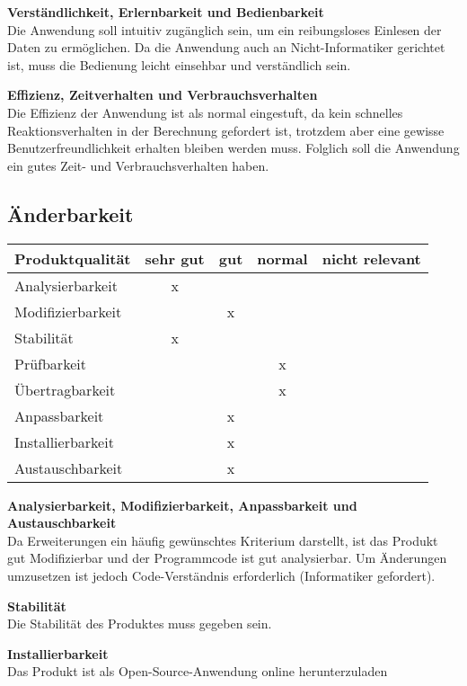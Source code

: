 \documentclass[parskip=full]{scrartcl} %
\begin{document}
\textbf{Verständlichkeit, Erlernbarkeit und Bedienbarkeit}\\
Die Anwendung soll intuitiv zugänglich sein, um ein reibungsloses Einlesen der Daten zu ermöglichen. Da die Anwendung auch an Nicht-Informatiker gerichtet ist, muss die Bedienung leicht einsehbar und verständlich sein.

\textbf{Effizienz, Zeitverhalten und Verbrauchsverhalten}\\
Die Effizienz der Anwendung ist als normal eingestuft, da kein schnelles Reaktionsverhalten in der Berechnung gefordert ist, trotzdem aber eine gewisse Benutzerfreundlichkeit erhalten bleiben werden muss. Folglich soll die Anwendung ein gutes Zeit- und Verbrauchsverhalten haben.

\subsection{Änderbarkeit}
    \begin{tabular}{|l| c| c| c| c|}
    \hline
        Produktqualität & sehr gut & gut & normal & nicht relevant \\
    \hline
        Analysierbarkeit & x & & &\\
    \hline
        Modifizierbarkeit & & x & &\\
    \hline
        Stabilität & x & & &\\
    \hline
        Prüfbarkeit & & & x &\\
    \hline
        Übertragbarkeit & & & x &\\
    \hline
        Anpassbarkeit & & x & &\\
    \hline
        Installierbarkeit & & x & &\\
    \hline
        Austauschbarkeit & & x & &\\
    \hline
    \end{tabular}
    
\textbf{Analysierbarkeit, Modifizierbarkeit, Anpassbarkeit und Austauschbarkeit}\\
Da Erweiterungen ein häufig gewünschtes Kriterium darstellt, ist das Produkt gut Modifizierbar und der Programmcode ist gut analysierbar. Um Änderungen umzusetzen ist jedoch Code-Verständnis erforderlich (Informatiker gefordert).

\textbf{Stabilität}\\
Die Stabilität des Produktes muss gegeben sein.

\textbf{Installierbarkeit}\\
Das Produkt ist als Open-Source-Anwendung online herunterzuladen
\end{document}
